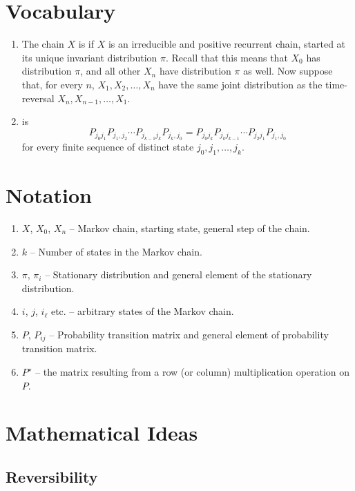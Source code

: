 \documentclass[12pt]{article}
\begin{document}
\section*{Vocabulary}
\begin{enumerate}
  \item  The chain $X$ is  if  $X$ is an irreducible and positive recurrent chain, started at its unique invariant
distribution $\pi$. Recall that this means that $X_0$ has distribution
$\pi$, and all other $X_n$ have distribution $\pi$ as well.
Now suppose that, for every $n$, $X_1, X_2, \dots , X_n$ have the same joint distribution as the time-reversal
$X_n, X_{n−1}, \dots , X_1$.
\item  {} is
  \[
  P_{j_0 j_1} P_{j_1,j_2} \cdots P_{j_{k-1} j_k} P_{j_k, j_0} =
  P_{j_0 j_k} P_{j_k j_{k-1}} \cdots P_{j_2 j_1} P_{j_1, j_0}
\]
for every finite sequence of distinct state $j_0, j_1, \dots, j_k$.
\end{enumerate}

\section*{Notation}
\begin{enumerate}
\item $X$, $X_0$, $X_n$ -- Markov chain, starting state, general step
  of the chain.
\item $k$ -- Number of states in the Markov chain.
\item $\pi$, $\pi_i$ -- Stationary distribution and general element of
  the stationary distribution.
\item $i$, $j$, $i_{\ell}$ etc. -- arbitrary states of the Markov
  chain.
\item $P$, $P_{ij}$ -- Probability transition matrix and general
  element of probability transition matrix.
\item $P^{\star}$ -- the matrix resulting from a row (or column) multiplication operation on $P$.
\end{enumerate}
\hr

\section*{Mathematical Ideas}
\subsection*{Reversibility}
\end{document}
